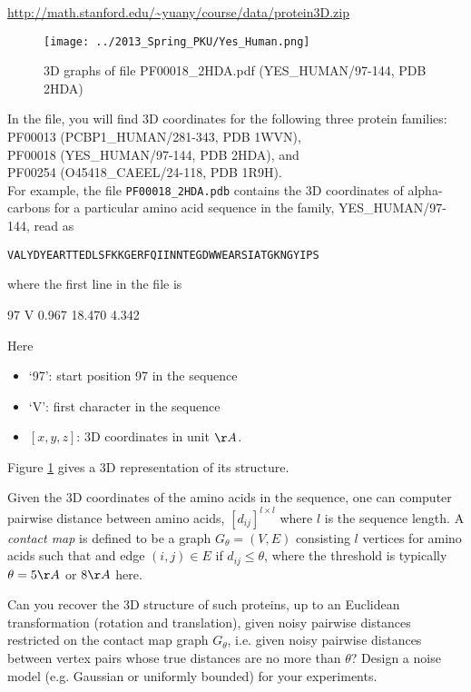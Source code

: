 \documentclass[11pt]{article}
\begin{document}
\url{http://math.stanford.edu/~yuany/course/data/protein3D.zip}

\begin{figure}[htbp]
\begin{center}
\texttt{[image: ../2013\_Spring\_PKU/Yes\_Human.png]}  
\caption{3D graphs of file PF00018\_2HDA.pdf (YES\_HUMAN/97-144, PDB 2HDA)}
\label{yes_human}
\end{center}
\end{figure}

\noindent In the file, you will find 3D coordinates for the following three protein families: 
\subitem PF00013 (PCBP1\_HUMAN/281-343, PDB 1WVN), \\
\subitem PF00018 (YES\_HUMAN/97-144, PDB 2HDA), and \\
\subitem PF00254 (O45418\_CAEEL/24-118, PDB 1R9H). \\

For example, the file {\tt PF00018\_2HDA.pdb} contains the 3D coordinates of alpha-carbons for a particular amino acid sequence in the family, YES\_HUMAN/97-144, read as

{\tt{VALYDYEARTTEDLSFKKGERFQIINNTEGDWWEARSIATGKNGYIPS}}

\noindent where the first line in the file is 

97	V	0.967	18.470	4.342

\noindent Here
\begin{itemize}
\item `97': start position 97 in the sequence
\item `V': first character in the sequence
\item $[x,y,z]$: 3D coordinates in unit $\AA$.
\end{itemize}

\noindent Figure \ref{yes_human} gives a 3D representation of its structure. 


Given the 3D coordinates of the amino acids in the sequence, one can computer pairwise distance between amino acids, $[d_{ij}]^{l\times l}$ where $l$ is the sequence length. A \emph{contact map} is defined to be a graph $G_\theta=(V,E)$ consisting $l$ vertices for amino acids such that and edge $(i,j)\in E$ if $d_{ij} \leq \theta$, where the threshold is typically $\theta=5\AA$ or $8\AA$ here. 

Can you recover the 3D structure of such proteins, up to an Euclidean transformation (rotation and translation), given noisy pairwise distances restricted on the contact map graph $G_\theta$, i.e. given noisy pairwise distances between vertex pairs whose true distances are no more than $\theta$? Design a noise model (e.g. Gaussian or uniformly bounded) for your experiments. 
\end{document}
